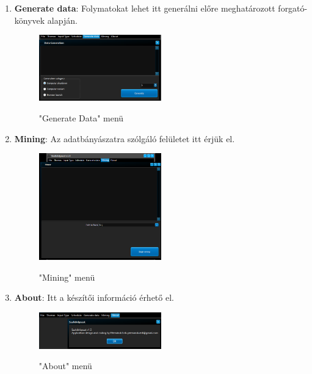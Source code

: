 \begin{enumerate}
{\begin{figure}[h!]
\begin{center}
				\label{fig:example}
			\end{center}
		\end{figure}
	}
	\item{
		\textbf{Generate data}: Folymatokat lehet itt generálni előre meghatározott forgató\hyp{}könyvek alapján.
		\begin{figure}[h!]
			\begin{center}
				\caption{"Generate Data" menü}
				\includegraphics[width=0.5\textwidth, keepaspectratio=true]{images/img_ui_datagen}\\
				\label{fig:example}
			\end{center}
		\end{figure}
	}
	\item{
		\textbf{Mining}: Az adatbányászatra szólgáló felületet itt érjük el.
		\begin{figure}[h!]
			\begin{center}
				\caption{"Mining" menü}
				\includegraphics[width=0.5\textwidth, keepaspectratio=true]{images/img_ui_mining}\\
				\label{fig:example}
			\end{center}
		\end{figure}
	}
	\item{
		\textbf{About}: Itt a készítői információ érhető el.
		\begin{figure}[h!]
			\begin{center}
				\caption{"About" menü}
				\includegraphics[width=0.5\textwidth, keepaspectratio=true]{images/img_ui_about}\\
				\label{fig:example}
			\end{center}
		\end{figure}
	}
\end{enumerate}

